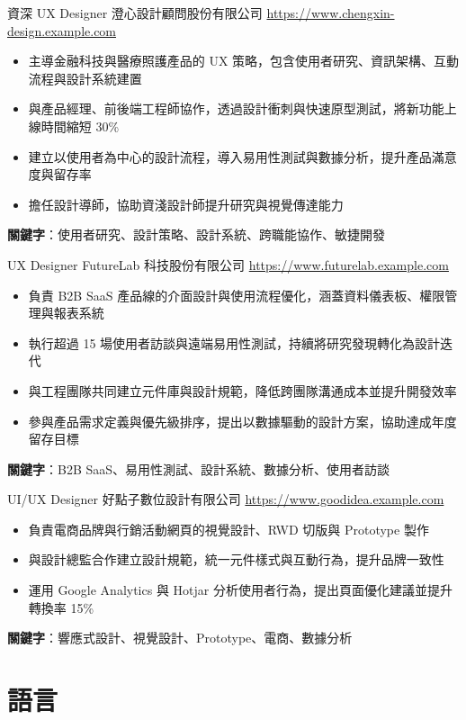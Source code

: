 \documentclass[a4paper, serif, 10pt]{moderncv}
\begin{document}
        {資深 UX Designer}
        {澄心設計顧問股份有限公司}
        {\url{https://www.chengxin-design.example.com}}
        {}
        {\begin{itemize}
\item 主導金融科技與醫療照護產品的 UX 策略，包含使用者研究、資訊架構、互動流程與設計系統建置
\item 與產品經理、前後端工程師協作，透過設計衝刺與快速原型測試，將新功能上線時間縮短 30\%
\item 建立以使用者為中心的設計流程，導入易用性測試與數據分析，提升產品滿意度與留存率
\item 擔任設計導師，協助資淺設計師提升研究與視覺傳達能力
\end{itemize}
\textbf{關鍵字}：使用者研究、設計策略、設計系統、跨職能協作、敏捷開發}

        {UX Designer}
        {FutureLab 科技股份有限公司}
        {\url{https://www.futurelab.example.com}}
        {}
        {\begin{itemize}
\item 負責 B2B SaaS 產品線的介面設計與使用流程優化，涵蓋資料儀表板、權限管理與報表系統
\item 執行超過 15 場使用者訪談與遠端易用性測試，持續將研究發現轉化為設計迭代
\item 與工程團隊共同建立元件庫與設計規範，降低跨團隊溝通成本並提升開發效率
\item 參與產品需求定義與優先級排序，提出以數據驅動的設計方案，協助達成年度留存目標
\end{itemize}
\textbf{關鍵字}：B2B SaaS、易用性測試、設計系統、數據分析、使用者訪談}

        {UI/UX Designer}
        {好點子數位設計有限公司}
        {\url{https://www.goodidea.example.com}}
        {}
        {\begin{itemize}
\item 負責電商品牌與行銷活動網頁的視覺設計、RWD 切版與 Prototype 製作
\item 與設計總監合作建立設計規範，統一元件樣式與互動行為，提升品牌一致性
\item 運用 Google Analytics 與 Hotjar 分析使用者行為，提出頁面優化建議並提升轉換率 15\%
\end{itemize}
\textbf{關鍵字}：響應式設計、視覺設計、Prototype、電商、數據分析}
\section{語言}
\end{document}
